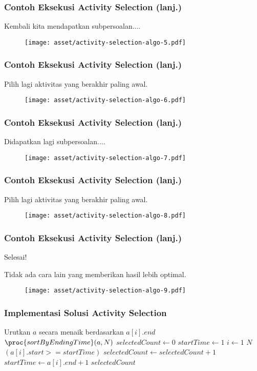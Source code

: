 \begin{frame}
  \frametitle{Contoh Eksekusi Activity Selection (lanj.)}
  Kembali kita mendapatkan subpersoalan....
  \begin{figure}
    \texttt{[image: asset/activity-selection-algo-5.pdf]}
  \end{figure}
\end{frame}

\begin{frame}
  \frametitle{Contoh Eksekusi Activity Selection (lanj.)}
  Pilih lagi aktivitas yang berakhir paling awal.
  \begin{figure}
    \texttt{[image: asset/activity-selection-algo-6.pdf]}
  \end{figure}
\end{frame}

\begin{frame}
  \frametitle{Contoh Eksekusi Activity Selection (lanj.)}
  Didapatkan lagi subpersoalan....
  \begin{figure}
    \texttt{[image: asset/activity-selection-algo-7.pdf]}
  \end{figure}
\end{frame}

\begin{frame}
  \frametitle{Contoh Eksekusi Activity Selection (lanj.)}
  Pilih lagi aktivitas yang berakhir paling awal.
  \begin{figure}
    \texttt{[image: asset/activity-selection-algo-8.pdf]}
  \end{figure}
\end{frame}

\begin{frame}
  \frametitle{Contoh Eksekusi Activity Selection (lanj.)}
  Selesai!

  Tidak ada cara lain yang memberikan hasil lebih optimal.
  \begin{figure}
    \texttt{[image: asset/activity-selection-algo-9.pdf]}
  \end{figure}
\end{frame}

\begin{frame} [fragile]
  \frametitle{Implementasi Solusi Activity Selection}
  \begin{codebox}
    \li \Comment Urutkan $a$ secara menaik berdasarkan $a[i].end$
    \li $\proc{sortByEndingTime}(a, N)$
    \zi
    \li $selectedCount \gets 0$
    \li $startTime \gets 1$
    \li \For $i \gets 1$ \To $N$ \Do
    \li   \If $(a[i].start >= startTime)$ \Then
    \li     $selectedCount \gets selectedCount + 1$
    \li     $startTime \gets a[i].end + 1$
          \End
        \End
    \li \Return $selectedCount$
  \end{codebox}
\end{frame}

